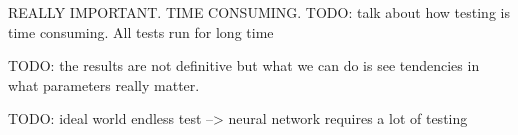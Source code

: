 REALLY IMPORTANT. TIME CONSUMING.
TODO: talk about how testing is time consuming. All tests run for long time

TODO: the results are not definitive but what we can do is see tendencies in what parameters really matter.

TODO: ideal world endless test --> neural network requires a lot of testing